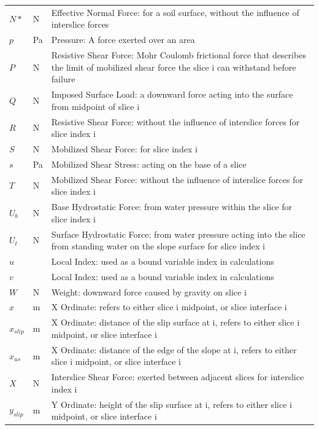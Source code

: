 \documentclass[12pt]{article}
\begin{document}
\begin{longtable}{  l  l  p{8.5cm}  }
$N*$ &\si{\newton} & Effective Normal Force: for a soil surface, without the influence of interslice forces
\\
$p$ & \si{\pascal} & Pressure: A force exerted over an area
\\
$P$ & \si{\newton} & Resistive Shear Force: Mohr Coulomb frictional force that describes the limit of mobilized shear force the slice i can withstand before failure
\\
$Q$ & \si{\newton} & Imposed Surface Load: a downward force acting into the surface from midpoint of slice i
\\
$R$ & \si{\newton} & Resistive Shear Force: without the influence of interslice forces for slice index i
\\
$S$ & \si{\newton} & Mobilized Shear Force: for slice index i
\\
$s$ &\si{\pascal} & Mobilized Shear Stress: acting on the base of a slice
\\
$T$ & \si{\newton} & Mobilized Shear Force: without the influence of interslice forces for slice index i
\\
${U_{b}}$ & \si{\newton} & Base Hydrostatic Force: from water pressure within the slice for slice index i
\\
${U_{t}}$ & \si{\newton} & Surface Hydrostatic Force: from water pressure acting into the slice from standing water on the slope surface for slice index i
\\
$u$ & & Local Index: used as a bound variable index in calculations
\\
$v$ &  &Local Index: used as a bound variable index in calculations
\\
$W$ & \si{\newton} &Weight: downward force caused by gravity on slice i
\\
$x$ & \si{\meter}& X Ordinate: refers to either slice i midpoint, or slice interface i
\\
${x_{slip}}$ &  \si{\meter}&X Ordinate: distance of the slip surface at i, refers to either slice i midpoint, or slice interface i
\\
${x_{us}}$ &  \si{\meter}&X Ordinate: distance of the edge of the slope at i, refers to either slice i midpoint, or slice interface i
\\
$X$ & \si{\newton} & Interslice Shear Force: exerted between adjacent slices for interslice index i
\\
${y_{slip}}$ & \si{\meter}& Y Ordinate: height of the slip surface at i, refers to either slice i midpoint, or slice interface i 
\\

\end{longtable}
\end{document}
